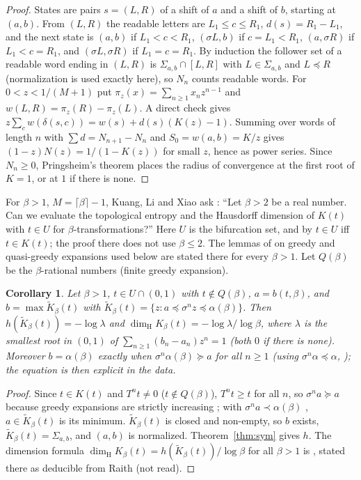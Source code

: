 \documentclass[11pt]{amsart}
\newtheorem{corollary}[theorem]{Corollary}
\theoremstyle{remark}
\newcommand{\dimH}{\dim_{\mathrm H}}
\newcommand{\lex}{\preccurlyeq}
\begin{document}
\begin{proof}
States are pairs $s=(L,R)$ of a shift of $a$ and a shift of $b$, starting at $(a,b)$. From $(L,R)$ the readable letters are $L_1\le c\le R_1$, $d(s)=R_1-L_1$, and the next state is $(a,b)$ if $L_1<c<R_1$, $(\sigma L,b)$ if $c=L_1<R_1$, $(a,\sigma R)$ if $L_1<c=R_1$, and $(\sigma L,\sigma R)$ if $L_1=c=R_1$. By induction the follower set of a readable word ending in $(L,R)$ is $\Sigma_{a,b}\cap[L,R]$ with $L\in\Sigma_{a,b}$ and $L\lex R$ (normalization is used exactly here), so $N_n$ counts readable words. For $0<z<1/(M+1)$ put $\pi_z(x)=\sum_{n\ge1}x_nz^{n-1}$ and $w(L,R)=\pi_z(R)-\pi_z(L)$. A direct check gives $z\sum_cw(\delta(s,c))=w(s)+d(s)(K(z)-1)$. Summing over words of length $n$ with $\sum d=N_{n+1}-N_n$ and $S_0=w(a,b)=K/z$ gives $(1-z)N(z)=1/(1-K(z))$ for small $z$, hence as power series. Since $N_n\ge0$, Pringsheim's theorem places the radius of convergence at the first root of $K=1$, or at $1$ if there is none.
\end{proof}

For $\beta>1$, $M=\lceil\beta\rceil-1$, Kuang, Li and Xiao ask \cite[Question~4.10]{KLX}: ``Let $\beta>2$ be a real number. Can we evaluate the topological entropy and the Hausdorff dimension of $K(t)$ with $t\in U$ for $\beta$-transformations?'' Here $U$ is the bifurcation set, and by \cite[Lemma~3.1]{KLX} $t\in U$ iff $t\in K(t)$; the proof there does not use $\beta\le2$. The lemmas of \cite{KLX} on greedy and quasi-greedy expansions used below are stated there for every $\beta>1$. Let $Q(\beta)$ be the $\beta$-rational numbers (finite greedy expansion).

\begin{corollary}\label{cor:B}
Let $\beta>1$, $t\in U\cap(0,1)$ with $t\notin Q(\beta)$, $a=b(t,\beta)$, and $b=\max\tilde K_\beta(t)$ with $\tilde K_\beta(t)=\{z:a\lex\sigma^nz\lex\alpha(\beta)\}$. Then $h(\tilde K_\beta(t))=-\log\lambda$ and $\dimH K_\beta(t)=-\log\lambda/\log\beta$, where $\lambda$ is the smallest root in $(0,1)$ of $\sum_{n\ge1}(b_n-a_n)z^n=1$ (both $0$ if there is none). Moreover $b=\alpha(\beta)$ exactly when $\sigma^n\alpha(\beta)\succcurlyeq a$ for all $n\ge1$ (using $\sigma^n\alpha\lex\alpha$, \cite[Lemma~4.6]{KLX}); the equation is then explicit in the data.
\end{corollary}

\begin{proof}
Since $t\in K(t)$ and $T^nt\ne0$ ($t\notin Q(\beta)$), $T^nt\ge t$ for all $n$, so $\sigma^na\succcurlyeq a$ because greedy expansions are strictly increasing \cite[Lemma~2.3]{KLX}; with $\sigma^na\prec\alpha(\beta)$ \cite[Lemma~2.2]{KLX}, $a\in\tilde K_\beta(t)$ is its minimum. $\tilde K_\beta(t)$ is closed and non-empty, so $b$ exists, $\tilde K_\beta(t)=\Sigma_{a,b}$, and $(a,b)$ is normalized. Theorem~\ref{thm:sym} gives $h$. The dimension formula $\dimH K_\beta(t)=h(\tilde K_\beta(t))/\log\beta$ for all $\beta>1$ is \cite[Lemma~6.2]{AKgen}, stated there as deducible from Raith \cite{Raith89} (not read).
\end{proof}
\end{document}
